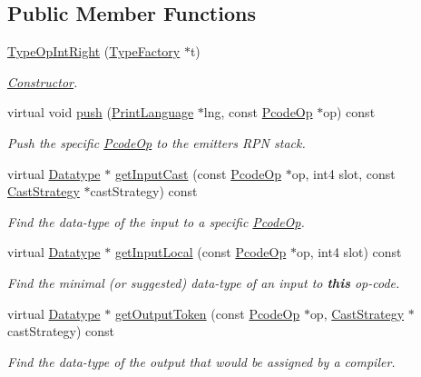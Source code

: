 \subsection*{Public Member Functions}
\begin{DoxyCompactItemize}
\item 
\mbox{\hyperlink{class_type_op_int_right_ad397b8d4c88dfe8b6d714c0ad2741491}{Type\+Op\+Int\+Right}} (\mbox{\hyperlink{class_type_factory}{Type\+Factory}} $\ast$t)
\begin{DoxyCompactList}\small\item\em \mbox{\hyperlink{class_constructor}{Constructor}}. \end{DoxyCompactList}\item 
virtual void \mbox{\hyperlink{class_type_op_int_right_ad559bbd46ae7088009581400e81fa467}{push}} (\mbox{\hyperlink{class_print_language}{Print\+Language}} $\ast$lng, const \mbox{\hyperlink{class_pcode_op}{Pcode\+Op}} $\ast$op) const
\begin{DoxyCompactList}\small\item\em Push the specific \mbox{\hyperlink{class_pcode_op}{Pcode\+Op}} to the emitter\textquotesingle{}s R\+PN stack. \end{DoxyCompactList}\item 
virtual \mbox{\hyperlink{class_datatype}{Datatype}} $\ast$ \mbox{\hyperlink{class_type_op_int_right_a068545a29778b9e9a72b95c2a0f9422f}{get\+Input\+Cast}} (const \mbox{\hyperlink{class_pcode_op}{Pcode\+Op}} $\ast$op, int4 slot, const \mbox{\hyperlink{class_cast_strategy}{Cast\+Strategy}} $\ast$cast\+Strategy) const
\begin{DoxyCompactList}\small\item\em Find the data-\/type of the input to a specific \mbox{\hyperlink{class_pcode_op}{Pcode\+Op}}. \end{DoxyCompactList}\item 
virtual \mbox{\hyperlink{class_datatype}{Datatype}} $\ast$ \mbox{\hyperlink{class_type_op_int_right_afd6976a40304a509b940a874da58b31b}{get\+Input\+Local}} (const \mbox{\hyperlink{class_pcode_op}{Pcode\+Op}} $\ast$op, int4 slot) const
\begin{DoxyCompactList}\small\item\em Find the minimal (or suggested) data-\/type of an input to {\bfseries{this}} op-\/code. \end{DoxyCompactList}\item 
virtual \mbox{\hyperlink{class_datatype}{Datatype}} $\ast$ \mbox{\hyperlink{class_type_op_int_right_a3c470ddca0dbdab3b01d8734308edd26}{get\+Output\+Token}} (const \mbox{\hyperlink{class_pcode_op}{Pcode\+Op}} $\ast$op, \mbox{\hyperlink{class_cast_strategy}{Cast\+Strategy}} $\ast$cast\+Strategy) const
\begin{DoxyCompactList}\small\item\em Find the data-\/type of the output that would be assigned by a compiler. \end{DoxyCompactList}\end{DoxyCompactItemize}
